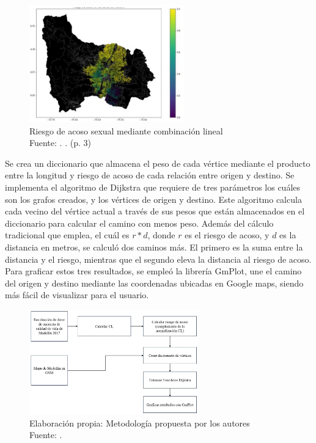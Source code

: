 \begin{figure}[h]
	\begin{center}
		\includegraphics[width=0.6\textwidth]{2/figures/segmento.jpg}
		\caption{Riesgo de acoso sexual mediante combinación lineal \\
			Fuente: \citep*{pr_areiza}. . (p. 3)}
		\label{1:fig2}
	\end{center}
\end{figure}
Se crea un diccionario que almacena el peso de cada vértice mediante el producto entre la longitud y riesgo de acoso de cada relación entre origen y destino. Se implementa el algoritmo de Dijkstra que requiere de tres parámetros los cuáles son los grafos creados, y los vértices de origen y destino. Este algoritmo calcula cada vecino del vértice actual a través de sus pesos que están almacenados en el diccionario para calcular el camino con menos peso. Además del cálculo tradicional que emplea, el cuál es $r*d$, donde $r$ es el riesgo de acoso, y $d$ es la distancia en metros, se calculó dos caminos más. El primero es la suma entre la distancia y el riesgo, mientras que el segundo eleva la distancia al riesgo de acoso. Para graficar estos tres resultados, se empleó la librería GmPlot, une el camino del origen y destino mediante las coordenadas ubicadas en Google maps, siendo más fácil de visualizar para el usuario.
\begin{figure}[h]
	\begin{center}
		\includegraphics[width=0.65\textwidth]{2/figures/medellinMetodo.jpg}
		\caption{Elaboración propia: Metodología propuesta por los autores  \\
			Fuente: \citep*{pr_areiza}. }
		\label{1:fig2}
	\end{center}
\end{figure}
